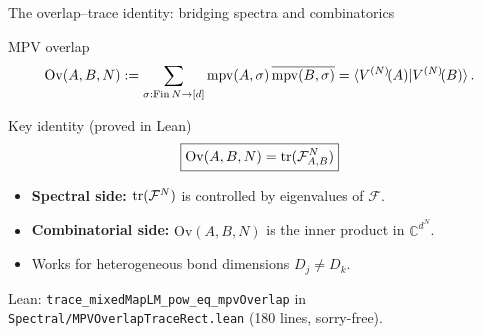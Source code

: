 \documentclass[aspectratio=169,10pt]{beamer}
\newcommand{\cF}{\mathcal{F}}
\newcommand{\Ov}{\mathrm{Ov}}
\begin{document}
\begin{frame}{The overlap--trace identity: bridging spectra and combinatorics}
    \vspace{-0.6em}

    \begin{block}{MPV overlap}
        \vspace{-0.5em}
        \[
            \Ov(A,B,N) :=  \sum_{\sigma:\mathrm{Fin}\,N\to[d]} \mathrm{mpv}(A,\sigma)\, \overline{\mathrm{mpv}(B,\sigma)}
            = \braket{V^{(N)}\!(A)|V^{(N)}\!(B)}.
        \]
    \end{block}

    \begin{block}{Key identity (proved in Lean)}
        \[
            \boxed{ \Ov(A,B,N) =  \tr(\cF_{A,B}^N) }
        \]
        \vspace{-0.8em}
        \begin{itemize}\itemsep0.15em
            \item \textbf{Spectral side:} $\tr(\cF^N)$ is controlled by eigenvalues of $\cF$.
            \item \textbf{Combinatorial side:} $\Ov(A,B,N)$ is the inner product in $\mathbb{C}^{d^N}$.
            \item Works for \alert{heterogeneous bond dimensions} $D_j \neq D_k$.
        \end{itemize}
    \end{block}

    \textcolor{dimwhite}{\footnotesize Lean: \texttt{trace\_mixedMapLM\_pow\_eq\_mpvOverlap}
        in \texttt{Spectral/MPVOverlapTraceRect.lean} (180 lines, sorry-free).}
\end{frame}
\end{document}
